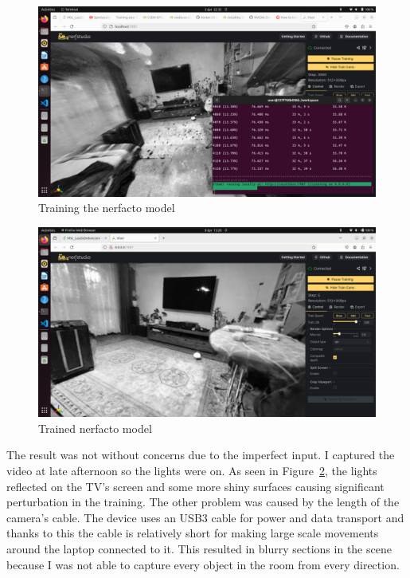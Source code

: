 \begin{figure}[htbp]
	\centering
	\includegraphics[width=150mm, keepaspectratio]{figures/nerfstudio.png}
	\caption{Training the nerfacto model}
	\label{fig:training_nerf_karcag}
\end{figure}

\begin{figure}[htbp]
	\centering
	\includegraphics[width=150mm, keepaspectratio]{figures/trained_nerf_karcag1.png}
	\caption{Trained nerfacto model}
	\label{fig:trained_nerf_karcag}
\end{figure}

The result was not without concerns due to the imperfect input. I captured the video at late afternoon so the lights were on. As seen in Figure~\ref{fig:trained_nerf_karcag}, the lights reflected on the TV's screen and some more shiny surfaces causing significant perturbation in the training. The other problem was caused by the length of the camera's cable. The device uses an USB3 cable for power and data transport and thanks to this the cable is relatively short for making large scale movements around the laptop connected to it. This resulted in blurry sections in the scene because I was not able to capture every object in the room from every direction.

